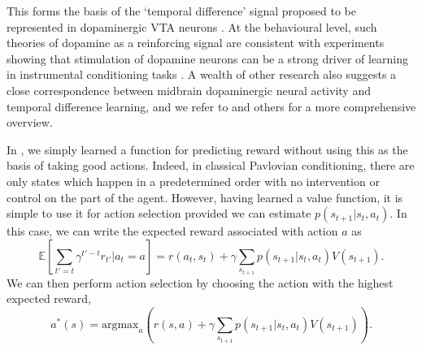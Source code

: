This forms the basis of the `temporal difference' signal proposed to be represented in dopaminergic VTA neurons \citep{schultz1997neural}.
At the behavioural level, such theories of dopamine as a reinforcing signal are consistent with experiments showing that stimulation of dopamine neurons can be a strong driver of learning in instrumental conditioning tasks \citep{olds1954positive, tsai2009phasic}.
A wealth of other research also suggests a close correspondence between midbrain dopaminergic neural activity and temporal difference learning, and we refer to \citet{niv2009reinforcement} and others for a more comprehensive overview.

In , we simply learned a function for predicting reward without using this as the basis of taking good actions.
Indeed, in classical Pavlovian conditioning, there are only states which happen in a predetermined order with no intervention or control on the part of the agent.
However, having learned a value function, it is simple to use it for action selection provided we can estimate $p(s_{t+1} | s_t, a_t)$.
In this case, we can write the expected reward associated with action $a$ as
\begin{equation}
    \mathbb{E} \left [\sum_{t' = t} \gamma^{t'-t} r_{t'} | a_t = a \right ] = r(a_t, s_t) + \gamma \sum_{s_{t+1}} p(s_{t+1} | s_t, a_t) V(s_{t+1}).
\end{equation}
We can then perform action selection by choosing the action with the highest expected reward,
\begin{equation}
    \label{eq:value_action_selection}
    a^*(s) = \text{argmax}_{a} \left ( r(s, a) + \gamma \sum_{s_{t+1}} p(s_{t+1} | s_t, a_t) V(s_{t+1}) \right ).
\end{equation}

